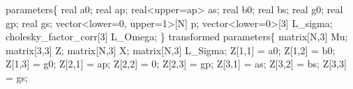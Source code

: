 \documentclass[
  12pt,
  letterpaper,
  DIV=11,
  numbers=noendperiod]{scrartcl}
\newenvironment{Shaded}{\begin{snugshade}}{\end{snugshade}}
\newcommand{\DataTypeTok}[1]{\textcolor[rgb]{0.68,0.00,0.00}{#1}}
\newcommand{\DecValTok}[1]{\textcolor[rgb]{0.68,0.00,0.00}{#1}}
\newcommand{\KeywordTok}[1]{\textcolor[rgb]{0.00,0.23,0.31}{#1}}
\newcommand{\NormalTok}[1]{\textcolor[rgb]{0.00,0.23,0.31}{#1}}
\begin{document}
\begin{Shaded}
\begin{Highlighting}[]
\KeywordTok{parameters}\NormalTok{\{}
  \DataTypeTok{real}\NormalTok{ a0;}
  \DataTypeTok{real}\NormalTok{ ap;}
  \DataTypeTok{real}\NormalTok{\textless{}}\KeywordTok{upper}\NormalTok{=ap\textgreater{} as;}
  \DataTypeTok{real}\NormalTok{ b0;}
  \DataTypeTok{real}\NormalTok{ bs;}
  \DataTypeTok{real}\NormalTok{ g0;}
  \DataTypeTok{real}\NormalTok{ gp;}
  \DataTypeTok{real}\NormalTok{ gs;}
  \DataTypeTok{vector}\NormalTok{\textless{}}\KeywordTok{lower}\NormalTok{=}\DecValTok{0}\NormalTok{, }\KeywordTok{upper}\NormalTok{=}\DecValTok{1}\NormalTok{\textgreater{}[N] p;}
  \DataTypeTok{vector}\NormalTok{\textless{}}\KeywordTok{lower}\NormalTok{=}\DecValTok{0}\NormalTok{\textgreater{}[}\DecValTok{3}\NormalTok{] L\_sigma;}
  \DataTypeTok{cholesky\_factor\_corr}\NormalTok{[}\DecValTok{3}\NormalTok{] L\_Omega;}
\NormalTok{\}}
\KeywordTok{transformed parameters}\NormalTok{\{}
  \DataTypeTok{matrix}\NormalTok{[N,}\DecValTok{3}\NormalTok{] Mu;}
  \DataTypeTok{matrix}\NormalTok{[}\DecValTok{3}\NormalTok{,}\DecValTok{3}\NormalTok{] Z;}
  \DataTypeTok{matrix}\NormalTok{[N,}\DecValTok{3}\NormalTok{] X;}
  \DataTypeTok{matrix}\NormalTok{[N,}\DecValTok{3}\NormalTok{] L\_Sigma;}
\NormalTok{  Z[}\DecValTok{1}\NormalTok{,}\DecValTok{1}\NormalTok{] = a0;}
\NormalTok{  Z[}\DecValTok{1}\NormalTok{,}\DecValTok{2}\NormalTok{] = b0;}
\NormalTok{  Z[}\DecValTok{1}\NormalTok{,}\DecValTok{3}\NormalTok{] = g0;}
\NormalTok{  Z[}\DecValTok{2}\NormalTok{,}\DecValTok{1}\NormalTok{] = ap;}
\NormalTok{  Z[}\DecValTok{2}\NormalTok{,}\DecValTok{2}\NormalTok{] = }\DecValTok{0}\NormalTok{;}
\NormalTok{  Z[}\DecValTok{2}\NormalTok{,}\DecValTok{3}\NormalTok{] = gp;}
\NormalTok{  Z[}\DecValTok{3}\NormalTok{,}\DecValTok{1}\NormalTok{] = as;}
\NormalTok{  Z[}\DecValTok{3}\NormalTok{,}\DecValTok{2}\NormalTok{] = bs;}
\NormalTok{  Z[}\DecValTok{3}\NormalTok{,}\DecValTok{3}\NormalTok{] = gs;}


\end{Highlighting}
\end{Shaded}
\end{document}
